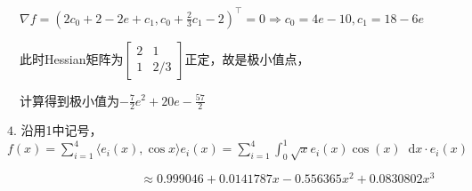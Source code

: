 \documentclass[cn,hazy,green,11pt,normal]{elegantnote}
\newcommand*{\diff}{\mathop{}\!\mathrm{d}}
\begin{document}
    $\quad \nabla f=\left(2c_0+2-2e+c_1,c_0+\frac23c_1-2\right)^{\top}=0\Rightarrow c_0=4e-10,c_1=18-6e$

    $\quad$此时Hessian矩阵为$\begin{bmatrix}2&1\\1&2/3\end{bmatrix}$正定，故是极小值点，

    $\quad$计算得到极小值为$-\frac72e^2+20e-\frac{57}{2}$

    $4.\,\,$沿用1中记号，$f(x)=\sum_{i=1}^4 \langle e_i(x),\cos x \rangle e_i(x)=\sum_{i=1}^4\int_0^1\sqrt{x}e_i(x)\cos(x)\diff x\cdot e_i(x)$

    $\qquad\qquad\qquad\qquad\qquad\,\,\,\, \approx 0.999046+0.0141787 x-0.556365 x^2+0.0830802x^3$
\end{document}
